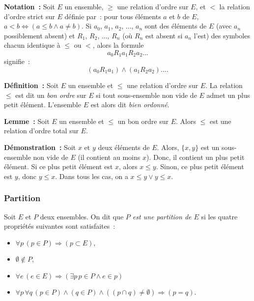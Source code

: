 \medskip

\noindent\textbf{Notation :} Soit $E$ un ensemble, $\geq$ une relation d'ordre sur $E$, et $<$ la relation d'ordre strict sur $E$ définie par : pour tous éléments $a$ et $b$ de $E$, $a < b \Leftrightarrow ( a \leq b \wedge a \neq b )$. 
    Si $a_0$, $a_1$, $a_2$, ..., $a_n$ sont des éléments de $E$ (avec $a_n$ possiblement absent) et $R_1$, $R_2$, ..., $R_n$ (où $R_n$ est absent si $a_n$ l'est) des symboles chacun identique à $\leq$ ou $<$, alors la formule
    \begin{equation*}
        a_0 \mathrel{R_1} a_1 \mathrel{R_2} a_2 \dots
    \end{equation*}
    signifie :
    \begin{equation*}
        (a_0 \mathrel{R_1} a_1) \wedge (a_1 \mathrel{R_2} a_2) \dots .
    \end{equation*}

\medskip

\noindent\textbf{Définition :} Soit $E$ un ensemble et $\leq$ une relation d'ordre sur $E$. 
    La relation $\leq$ est dit un \textit{bon ordre} sur $E$ si tout sous-ensemble non vide de $E$ admet un plus petit élément.
    L'ensemble $E$ est alors dit \textit{bien ordonné}.

\medskip

\noindent\textbf{Lemme :} Soit $E$ un ensemble et $\leq$ un bon ordre sur $E$. 
    Alors $\leq$ est une relation d'ordre total sur $E$.

\medskip

\noindent\textbf{Démonstration :}
    Soit $x$ et $y$ deux éléments de $E$. 
    Alors, $\lbrace x, y \rbrace$ est un sous-ensemble non vide de $E$ (il contient au moins $x$).
    Donc, il contient un plus petit élément. 
    Si ce plus petit élément est $x$, alors $x \leq y$.
    Sinon, ce plus petit élément est $y$, donc $y \leq x$.
    Dans tous les cas, on a $x \leq y \vee y \leq x$.

    \done

\subsubsection{Partition} 

Soit $E$ et $P$ deux ensembles. 
On dit que \textit{$P$ est une partition de $E$} si les quatre propriétés suivantes sont satisfaites : 
\begin{itemize}[nosep]
    \item $\forall p \, (p \in P) \Rightarrow (p \subset E)$, 
    \item $\emptyset \notin P$, 
    \item $\forall e \, (e \in E) \Rightarrow (\exists p \, p \in P \wedge e \in p)$
    \item $\forall p \, \forall q \, (p \in P) \wedge (q \in P) \wedge ((p \cap q) \neq \emptyset) \Rightarrow (p = q)$. 
\end{itemize}

